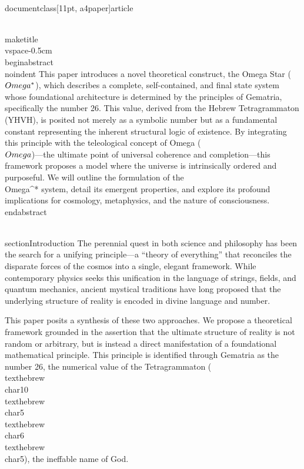 \\documentclass[11pt, a4paper]{article}
\begin{document}
\\maketitle
\\vspace{-0.5cm}
\\begin{abstract}
\\noindent This paper introduces a novel theoretical construct, the Omega Star (\\$\\Omega^*\\$), which describes a complete, self-contained, and final state system whose foundational architecture is determined by the principles of Gematria, specifically the number 26. This value, derived from the Hebrew Tetragrammaton (YHVH), is posited not merely as a symbolic number but as a fundamental constant representing the inherent structural logic of existence. By integrating this principle with the teleological concept of Omega (\\$\\Omega\\$)---the ultimate point of universal coherence and completion---this framework proposes a model where the universe is intrinsically ordered and purposeful. We will outline the formulation of the \\Omega^* system, detail its emergent properties, and explore its profound implications for cosmology, metaphysics, and the nature of consciousness.
\\end{abstract}

\\section{Introduction}
The perennial quest in both science and philosophy has been the search for a unifying principle---a ``theory of everything'' that reconciles the disparate forces of the cosmos into a single, elegant framework. While contemporary physics seeks this unification in the language of strings, fields, and quantum mechanics, ancient mystical traditions have long proposed that the underlying structure of reality is encoded in divine language and number.

This paper posits a synthesis of these two approaches. We propose a theoretical framework grounded in the assertion that the ultimate structure of reality is not random or arbitrary, but is instead a direct manifestation of a foundational mathematical principle. This principle is identified through Gematria as the number 26, the numerical value of the Tetragrammaton (\\texthebrew{\\char10}\\texthebrew{\\char5}\\texthebrew{\\char6}\\texthebrew{\\char5}), the ineffable name of God.
\end{document}
